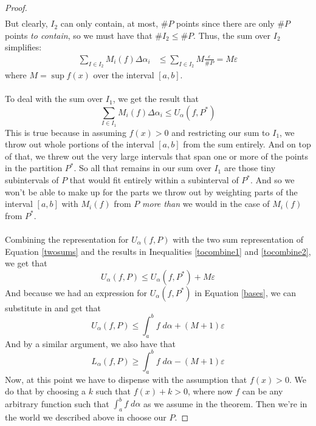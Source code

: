 \documentclass[12pt]{article}
\theoremstyle{plain}
\theoremstyle{definition}
\theoremstyle{remark}
\begin{document}
\begin{proof}
\begin{align}
         \label{twosums}
\end{align}
But clearly, $I_2$ can only contain, at most, $\#P$ points since there are only $\#P$ points \emph{to contain}, so we must have that $\#I_2 \leq \#P$. Thus, the sum over $I_2$ simplifies:
\begin{align}
        \sum_{I\in I_2} M_i(f) \Delta\alpha_i 
        &\leq \sum_{I\in I_2} M \frac{\varepsilon}{\#P} =    
            M\varepsilon
        \label{tocombine1}
\end{align}
where $M = \sup f(x)$ over the interval $[a,b]$.
\\
\\
To deal with the sum over $I_1$, we get the result that 
\begin{equation}
    \label{tocombine2}
    \sum_{I\in I_1} M_i(f) \Delta\alpha_i  \leq U_\alpha(f,P^*)
\end{equation}
This is true because in assuming $f(x)>0$ and restricting our sum to $I_1$, we throw out whole portions of the interval $[a,b]$ from the sum entirely. And on top of that, we threw out the very large intervals that span one or more of the points in the partition $P^*$.  So all that remains in our sum over $I_1$ are those tiny subintervals of $P$ that would fit entirely within a subinterval of $P^*$. And so we won't be able to make up for the parts we throw out by weighting parts of the interval $[a,b]$ with $M_i(f)$ from $P$ \emph{more than} we would in the case of $M_i(f)$ from $P^*$.
\\
\\
Combining the representation for $U_\alpha(f,P)$ with the two sum representation of Equation \ref{twosums} and the results in Inequalities \ref{tocombine1} and \ref{tocombine2}, we get that
\begin{equation}
    U_\alpha(f,P) \leq U_\alpha(f,P^*) + M\varepsilon
\end{equation}
And because we had an expression for $U_\alpha(f,P^*)$ in Equation \ref{bases}, we can substitute in and get that
\begin{equation}
    \label{ass1}
    U_\alpha(f,P) \leq \int^b_a f\;d\alpha  + (M+1)\varepsilon
\end{equation}
And by a similar argument, we also have that 
\begin{equation}
    \label{ass2}
    L_\alpha(f,P) \geq \int^b_a f\;d\alpha  - (M+1)\varepsilon
\end{equation}
Now, at this point we have to dispense with the assumption that $f(x)>0$.  We do that by choosing a $k$ such that $f(x) + k >0$, where now $f$ can be any arbitrary function such that $\int^b_a f\;d\alpha$ as we assume in the theorem.  Then we're in the world we described above in choose our $P$. 

\end{proof}
\end{document}
